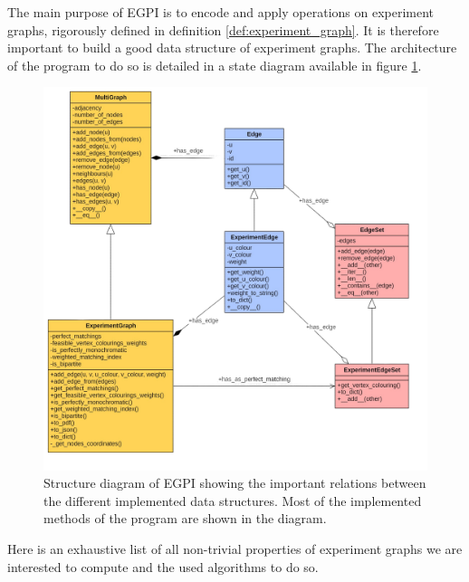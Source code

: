 The main purpose of EGPI is to encode and apply operations on experiment graphs, rigorously defined in definition \ref{def:experiment_graph}. It is therefore important to build a good data structure of experiment graphs. The architecture of the program to do so is detailed in a state diagram available in figure \ref{fig:structure_diagram}.

\begin{figure}[H]
    \centering
    \includegraphics[scale=0.25]{figures/new_results/egpi/structure_diagram}
    \caption{Structure diagram of EGPI showing the important relations between the different implemented data structures. Most of the implemented methods of the program are shown in the diagram.}
    \label{fig:structure_diagram}
\end{figure}

Here is an exhaustive list of all non-trivial properties of experiment graphs we are interested to compute and the used algorithms to do so.

